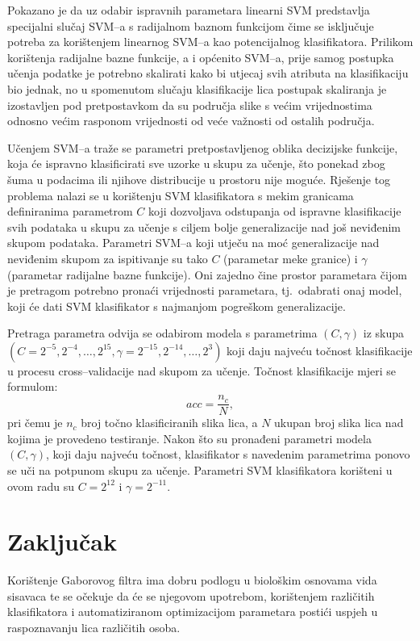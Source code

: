 \documentclass{article}
\begin{document}
Pokazano je da uz odabir ispravnih parametara \citep{keerthi2003asymptotic} linearni SVM
predstavlja specijalni slučaj SVM--a s radijalnom baznom funkcijom čime
se isključuje potreba za korištenjem linearnog SVM--a kao potencijalnog
klasifikatora. Prilikom korištenja radijalne bazne funkcije, a i općenito
SVM--a, prije samog postupka učenja podatke je potrebno skalirati kako bi utjecaj svih
atributa na klasifikaciju bio jednak, no u spomenutom slučaju klasifikacije
lica postupak skaliranja je izostavljen pod pretpostavkom da su područja slike s
većim vrijednostima odnosno većim rasponom vrijednosti od veće važnosti od
ostalih područja. 

Učenjem SVM--a traže se parametri pretpostavljenog oblika decizijske funkcije,
koja će ispravno klasificirati sve uzorke u skupu za učenje, što ponekad zbog
šuma u podacima ili njihove distribucije u prostoru nije moguće. Rješenje tog
problema nalazi se u korištenju SVM klasifikatora s mekim granicama definiranima
parametrom $C$ koji dozvoljava odstupanja od ispravne klasifikacije svih podataka
u skupu za učenje s ciljem bolje generalizacije nad još neviđenim skupom
podataka. Parametri SVM--a koji utječu na moć generalizacije nad neviđenim skupom
za ispitivanje su tako $C$ (parametar meke granice) i $\gamma$ (parametar
radijalne bazne funkcije). Oni zajedno čine prostor parametara čijom je pretragom
potrebno pronaći vrijednosti parametara, tj.~odabrati onaj model, koji će dati
SVM klasifikator s najmanjom pogreškom generalizacije.

Pretraga parametra odvija se odabirom modela s parametrima $(C, \gamma)$ iz skupa
$\left (C = {2^{-5}, 2^{-4}, \ldots , 2^{15}},  \gamma = {2^{-15}, 2^{-14},
\ldots, 2^3} \right )$ \citep{CC01a} koji daju najveću točnost klasifikacije u
procesu cross--validacije nad skupom za učenje. Točnost klasifikacije mjeri se formulom:
\begin{equation}
acc = \frac{n_c}{N},
\end{equation}
pri čemu je $n_c$ broj točno klasificiranih slika lica, a $N$ ukupan broj slika
lica nad kojima je provedeno testiranje. Nakon što su pronađeni parametri modela $(C,
\gamma)$, koji daju najveću točnost, klasifikator s navedenim parametrima ponovo
se uči na potpunom skupu za učenje. Parametri SVM klasifikatora korišteni u ovom
radu su $C = 2^{12}$ i $\gamma = 2^{-11}$.


\section{Zaključak}

Korištenje Gaborovog filtra ima dobru podlogu u biološkim osnovama vida
sisavaca te se očekuje da će se njegovom upotrebom, korištenjem različitih klasifikatora i
automatiziranom optimizacijom parametara postići uspjeh u raspoznavanju lica različitih osoba.



\end{document}
